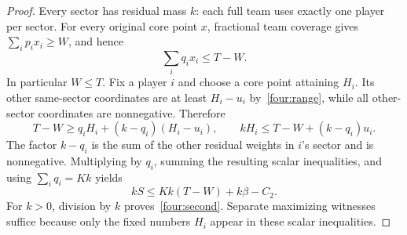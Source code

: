 \documentclass[11pt]{article}
\theoremstyle{remark}
\begin{document}
\begin{proof}
Every sector has residual mass $k$: each full team uses exactly one
player per sector. For every original core point $x$, fractional team
coverage gives $\sum_i p_ix_i\ge W$, and hence
\begin{equation}\label{four:residual}
                   \sum_iq_ix_i\le T-W.
\end{equation}
In particular $W\le T$. Fix a player $i$ and choose a core point
attaining $H_i$. Its other same-sector coordinates are at least
$H_i-u_i$ by~\eqref{four:range}, while all other-sector coordinates
are nonnegative. Therefore
\[
        T-W\ge q_iH_i+(k-q_i)(H_i-u_i),
        \qquad
        kH_i\le T-W+(k-q_i)u_i.
\]
The factor $k-q_i$ is the sum of the other residual weights in $i$'s
sector and is nonnegative. Multiplying by $q_i$, summing the resulting
scalar inequalities, and using $\sum_iq_i=Kk$ yields
\[
                    kS\le Kk(T-W)+k\beta-C_2.
\]
For $k>0$, division by $k$ proves~\eqref{four:second}. Separate
maximizing witnesses suffice because only the fixed numbers $H_i$
appear in these scalar inequalities.
\end{proof}
\end{document}

